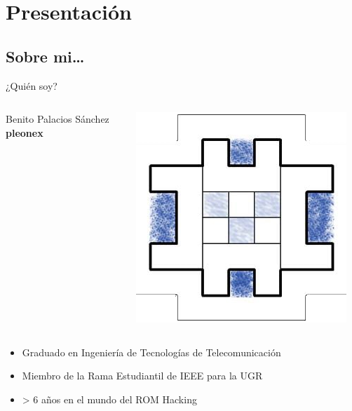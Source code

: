 \section{Presentación}
\subsection{Sobre mi\ldots}
\begin{frame}{¿Quién soy?}

    \begin{columns}
    \begin{column}{0.75\textwidth}
        \Large
        Benito Palacios Sánchez \\
        \textbf{pleonex}
    \end{column}
    \begin{column}{0.25\textwidth}
        \includegraphics[width=\textwidth]{../pleonex.png}
    \end{column}
    \end{columns}

    \vfill
    \setlength{\leftmargini}{0em}
    \begin{itemize}
        \item Graduado en Ingeniería de Tecnologías de Telecomunicación
        \item Miembro de la Rama Estudiantil de IEEE para la UGR
        \item > 6 años en el mundo del ROM Hacking
    \end{itemize}
\end{frame}

